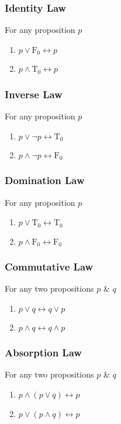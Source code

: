 \documentclass{article}
\begin{document}
	\subsubsection{Identity Law}
	For any proposition $p$
	\begin{enumerate}[label=\roman*) ]
		\item $p\lor \text{F}_0\leftrightarrow p$
		\item $p\land \text{T}_0\leftrightarrow p$
	\end{enumerate}

	\subsubsection{Inverse Law}
	For any proposition $p$
	\begin{enumerate}[label=\roman*) ]
		\item $p\lor\neg p\leftrightarrow \text{T}_0$
		\item $p\land\neg p\leftrightarrow \text{F}_0$
	\end{enumerate}

	\subsubsection{Domination Law}
	For any proposition $p$
	\begin{enumerate}[label=\roman*) ]
		\item $p\lor \text{T}_0\leftrightarrow \text{T}_0$
		\item $p\land \text{F}_0\leftrightarrow \text{F}_0$
	\end{enumerate}

	\subsubsection{Commutative Law}
	For any two propositions $p$ \& $q$
	\begin{enumerate}[label=\roman*) ]
		\item $p\lor q\leftrightarrow q\lor p$
		\item $p\land q\leftrightarrow q\land p$
	\end{enumerate}

	\subsubsection{Absorption Law}
	For any two propositions $p$ \& $q$
	\begin{enumerate}[label=\roman*) ]
		\item $p\land(p\lor q)\leftrightarrow p$
		\item $p\lor(p\land q)\leftrightarrow p$
	\end{enumerate}
\end{document}
